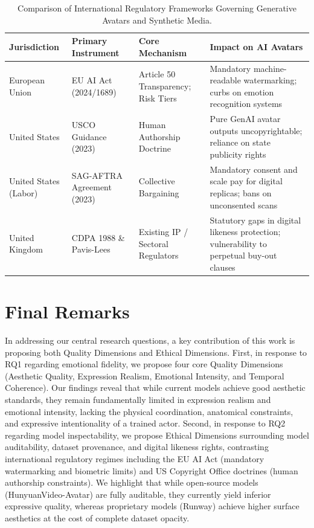 \documentclass[pdflatex,sn-mathphys-num]{sn-jnl}
\newcommand{\foo}{\hspace{1em}}
\theoremstyle{thmstyleone}
\theoremstyle{thmstyletwo}
\theoremstyle{thmstylethree}
\begin{document}
\begin{table}[ht!]
\caption{Comparison of International Regulatory Frameworks Governing Generative Avatars and Synthetic Media.}\label{tab:regulatory_frameworks}
\begin{tabular}{p{2.0cm} | @{\foo} p{2.6cm} | @{\foo} p{2.6cm} | @{\foo} p{3.3cm}}
\toprule
\textbf{Jurisdiction} & \textbf{Primary Instrument} & \textbf{Core Mechanism} & \textbf{Impact on AI Avatars} \\
\midrule
European Union & EU AI Act (2024/1689)~\cite{euaiact2024} & Article 50 Transparency; Risk Tiers & Mandatory machine-readable watermarking; curbs on emotion recognition systems \\
United States & USCO Guidance (2023)~\cite{usco2023guidance} & Human Authorship Doctrine & Pure GenAI avatar outputs uncopyrightable; reliance on state publicity rights \\
United States (Labor) & SAG-AFTRA Agreement (2023)~\cite{sagaftra2023summary} & Collective Bargaining & Mandatory consent and scale pay for digital replicas; bans on unconsented scans \\
United Kingdom & CDPA 1988 \& Pavis-Lees~\cite{pavis2025ai} & Existing IP / Sectoral Regulators & Statutory gaps in digital likeness protection; vulnerability to perpetual buy-out clauses \\
\bottomrule
\end{tabular}
\end{table}

\section{Final Remarks}\label{sec6}
In addressing our central research questions, a key contribution of this work is proposing both Quality Dimensions and Ethical Dimensions. First, in response to RQ1 regarding emotional fidelity, we propose four core Quality Dimensions (Aesthetic Quality, Expression Realism, Emotional Intensity, and Temporal Coherence). Our findings reveal that while current models achieve good aesthetic standards, they remain fundamentally limited in expression realism and emotional intensity, lacking the physical coordination, anatomical constraints, and expressive intentionality of a trained actor. Second, in response to RQ2 regarding model inspectability, we propose Ethical Dimensions surrounding model auditability, dataset provenance, and digital likeness rights, contrasting international regulatory regimes including the EU AI Act (mandatory watermarking and biometric limits) and US Copyright Office doctrines (human authorship constraints). We highlight that while open-source models (HunyuanVideo-Avatar) are fully auditable, they currently yield inferior expressive quality, whereas proprietary models (Runway) achieve higher surface aesthetics at the cost of complete dataset opacity.
\end{document}
